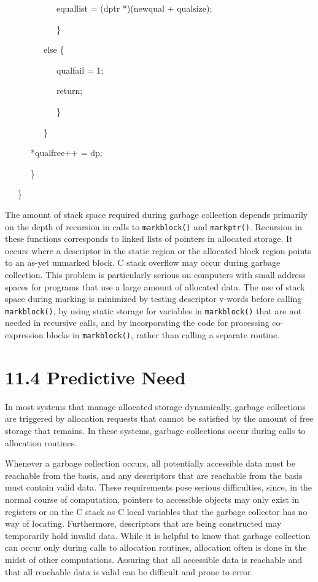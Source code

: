 {\ttfamily\mdseries
\ \ \ \ \ \ \ \ \ \ \ \ equallist = (dptr *)(newqual + qualsize);}

{\ttfamily\mdseries
\ \ \ \ \ \ \ \ \ \ \ \ \}
}

{\ttfamily\mdseries
\ \ \ \ \ \ \ \ \ else \{
}

{\ttfamily\mdseries
\ \ \ \ \ \ \ \ \ \ \ \ qualfail = 1;
}

{\ttfamily\mdseries
\ \ \ \ \ \ \ \ \ \ \ \ return;
}

{\ttfamily\mdseries
\ \ \ \ \ \ \ \ \ \ \ \ \}
}

{\ttfamily\mdseries
\ \ \ \ \ \ \ \ \ \}}

{\ttfamily\mdseries
\ \ \ \ \ \ *qualfree++ = dp;}

{\ttfamily\mdseries
\ \ \ \ \ \ \}}

{\ttfamily\mdseries
\ \ \ \}}

The amount of stack space required during garbage collection depends
primarily on the depth of recursion in calls to \texttt{markblock()}
and \texttt{markptr()}. Recursion in these functions corresponds to
linked lists of pointers in allocated storage. It occurs where a
descriptor in the static region or the allocated block region points
to an as-yet unmarked block. C stack overflow may occur during garbage
collection. This problem is particularly serious on computers with
small address spaces for programs that use a large amount of allocated
data. The use of stack space during marking is minimized by testing
descriptor v-words before calling \texttt{markblock()}, by using
static storage for variables in \texttt{markblock()} that are not
needed in recursive calls, and by incorporating the code for
processing co-expression blocks in \texttt{markblock()}, rather than
calling a separate routine.

\section[11.4 Predictive Need]{11.4 Predictive Need}

In most systems that manage allocated storage dynamically, garbage
collections are triggered by allocation requests that cannot be
satisfied by the amount of free storage that remains. In these
systems, garbage collections occur during calls to allocation
routines.


Whenever a garbage collection occurs, all potentially accessible data
must be reachable from the basis, and any descriptors that are
reachable from the basis must contain valid data. These requirements
pose serious difficulties, since, in the normal course of computation,
pointers to accessible objects may only exist in registers or on the C
stack as C local variables that the garbage collector has no way of
locating. Furthermore, descriptors that are being constructed may
temporarily hold invalid data. While it is helpful to know that
garbage collection can occur only during calls to allocation routines,
allocation often is done in the midst of other computations. Assuring
that all accessible data is reachable and that all reachable data is
valid can be difficult and prone to error.

